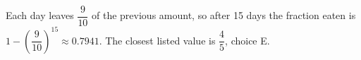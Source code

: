 Each day leaves $\dfrac{9}{10}$ of the previous amount, so after 15 days the fraction eaten is $1-(\dfrac{9}{10})^{15}\approx0.7941$. The closest listed value is $\boxed{\dfrac{4}{5}}$, choice E.
